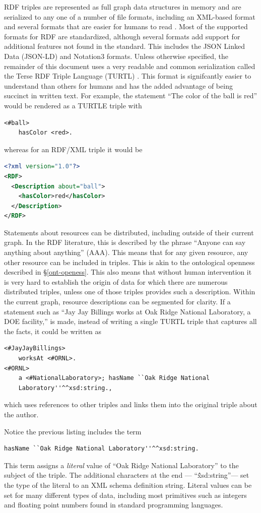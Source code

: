 RDF triples are represented as full graph data structures in memory and are
serialized to any one of a number of file formats, including an XML-based format
and several formats that are easier for humans to read \cite{rdf-wikipedia}.
Most of the supported formats for RDF are standardized, although several formats
add support for additional features not found in the standard. This includes the
JSON Linked Data (JSON-LD) and Notation3 formats. Unless otherwise
specified, the remainder of this document uses a very readable and common
serialization called the Terse RDF Triple Language (TURTL) \cite{turtl}. This
format is signifcantly easier to understand than others for humans and has the
added advantage of being succinct in written text. For example, the statement
``The color of the ball is red'' would be rendered as a TURTLE triple with
\begin{lstlisting}[language=TURTL]
<#ball>
    hasColor <red>.
\end{lstlisting}
whereas for an RDF/XML triple it would be
\begin{lstlisting}[language=XML]
<?xml version="1.0"?>
<RDF>
  <Description about="ball">
    <hasColor>red</hasColor>
  </Description>
</RDF>
\end{lstlisting}

Statements about resources can be distributed, including outside of their
current graph. In the RDF literature, this is described by the phrase ``Anyone
can say anything about anything'' (AAA). This means that for any given resource,
any other resource can be included in triples. This is akin to the ontological
openness described in \S \ref{ont-openess}. This also means that without human
intervention it is very hard to establish the origin of data for which there are
numerous distributed triples, unless one of those triples provides such a
description. Within the current graph, resource descriptions can be segmented
for clarity. If a statement such as ``Jay Jay Billings works at Oak Ridge
National Laboratory, a DOE facility,'' is made, instead of writing a single
TURTL triple that captures all the facts, it could be written as
\begin{lstlisting}[language=TURTL] <#JayJayBillings>
    worksAt <#ORNL>.
<#ORNL>
    a <#NationalLaboratory>; hasName ``Oak Ridge National
    Laboratory''^^xsd:string.,
\end{lstlisting}
which uses references to other triples and links them into the original triple
about the author.

Notice the previous listing includes the term
\begin{lstlisting}[language=TURTL]
    hasName ``Oak Ridge National Laboratory''^^xsd:string.
\end{lstlisting}
This term assigns a \textit{literal} value of ``Oak Ridge National Laboratory''
to the subject of the triple. The additional characters at the end ---
``\^\^xsd:string''--- set the type of the literal to an XML schema definition
string. Literal values can be set for many different types of data, including
most primitives such as integers and floating point numbers found in standard
programming languages.

